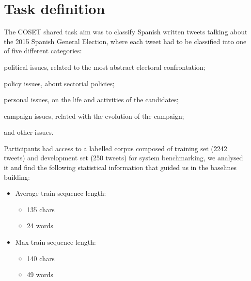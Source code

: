 \section{Task definition} \label{sec:task}

The COSET shared task aim was to classify Spanish written tweets talking about the 2015 Spanish General Election, where each tweet had to be classified into one of five different categories:
\begin{enumerate*}
\item political issues, related to the most abstract electoral confrontation; 
\item policy issues, about sectorial policies; 
\item personal issues, on the life and activities of the candidates; 
\item campaign issues, related with the evolution of the campaign;
\item and other issues.
\end{enumerate*}

Participants had access to a labelled corpus composed of training set (2242 tweets) and development set (250 tweets) for system benchmarking, we analysed it and find the following statistical information that guided us in the baselines building:
\begin{multicols}{2}
\begin{itemize}
	\item Average train sequence length:
	\begin{itemize}
		\item 135 chars 
		\item 24 words
	\end{itemize}
	\item Max train sequence length: 
	\begin{itemize}
		\item 140 chars
		\item 49 words
	\end{itemize}
\end{itemize}
\end{multicols}